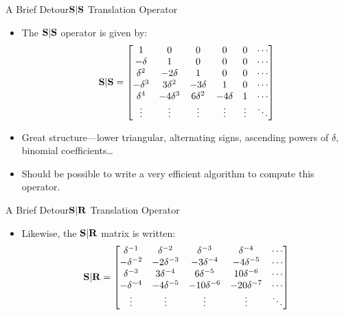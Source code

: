 \documentclass{beamer}
\begin{document}
\begin{frame}{A Brief Detour}{$\bold{S}|\bold{S}$ Translation Operator}
  \begin{itemize}
  \item The $\bold{S}|\bold{S}$ operator is given by:
    \begin{align*}
      \bold{S}|\bold{S} = \begin{bmatrix}
        1 & 0 & 0 & 0 & 0 & \cdots \\
        -\delta & 1 & 0 & 0 & 0 & \cdots \\
        \delta^2 & -2\delta & 1 & 0 & 0 & \cdots \\
        -\delta^3 & 3\delta^2 & -3\delta & 1 & 0 & \cdots \\
        \delta^4 & -4\delta^3 & 6 \delta^2 & -4 \delta & 1 & \cdots \\
        \vdots & \vdots & \vdots & \vdots & \vdots & \ddots
      \end{bmatrix}
    \end{align*}
    \pause
  \item Great structure\----lower triangular, alternating signs, ascending powers of $\delta$, binomial coefficients\ldots
  \item Should be possible to write a very efficient algorithm to compute this operator.
  \end{itemize}
\end{frame}

\begin{frame}{A Brief Detour}{$\bold{S}|\bold{R}$ Translation Operator}
  \begin{itemize}
  \item Likewise, the $\bold{S}|\bold{R}$ matrix is written:
    \begin{align*}
      \bold{S}|\bold{R} = \begin{bmatrix}
        \delta^{-1} & \delta^{-2} & \delta^{-3} & \delta^{-4} & \cdots \\
        -\delta^{-2} & -2\delta^{-3} & -3\delta^{-4} & -4\delta^{-5} & \cdots \\
        \delta^{-3} & 3\delta^{-4} & 6 \delta^{-5} & 10 \delta^{-6} & \cdots \\
        -\delta^{-4} & -4 \delta^{-5} & -10 \delta^{-6} & -20 \delta^{-7} & \cdots \\
        \vdots & \vdots & \vdots & \vdots & \ddots
      \end{bmatrix}
    \end{align*}
  \end{itemize}
\end{frame}
\end{document}
